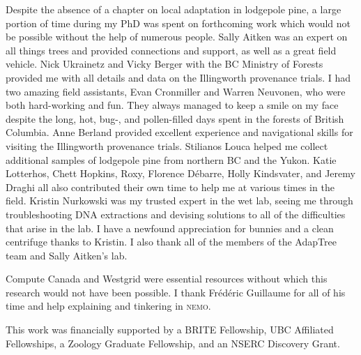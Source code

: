 Despite the absence of a chapter on local adaptation in lodgepole pine, a large portion of time during my PhD was spent on forthcoming work which would not be possible without the help of numerous people. Sally Aitken was an expert on all things trees and provided connections and support, as well as a great field vehicle. Nick Ukrainetz and Vicky Berger with the BC Ministry of Forests provided me with all details and data on the Illingworth provenance trials. I had two amazing field assistants, Evan Cronmiller and Warren Neuvonen, who were both hard-working and fun. They always managed to keep a smile on my face despite the long, hot, bug-, and pollen-filled days spent in the forests of British Columbia. Anne Berland provided excellent experience and navigational skills for visiting the Illingworth provenance trials. Stilianos Louca helped me collect additional samples of lodgepole pine from northern BC and the Yukon. Katie Lotterhos, Chett Hopkins, Roxy, Florence D\'ebarre, Holly Kindsvater, and Jeremy Draghi all also contributed their own time to help me at various times in the field. Kristin Nurkowski was my trusted expert in the wet lab, seeing me through troubleshooting DNA extractions and devising solutions to all of the difficulties that arise in the lab. I have a newfound appreciation for bunnies and a clean centrifuge thanks to Kristin. I also thank all of the members of the AdapTree team and Sally Aitken's lab.

Compute Canada and Westgrid were essential resources without which this research would not have been possible. I thank Fr\'ed\'eric Guillaume for all of his time and help explaining and tinkering in \textsc{nemo}.

This work was financially supported by a BRITE Fellowship, UBC Affiliated Fellowships, a Zoology Graduate Fellowship, and an NSERC Discovery Grant. 
